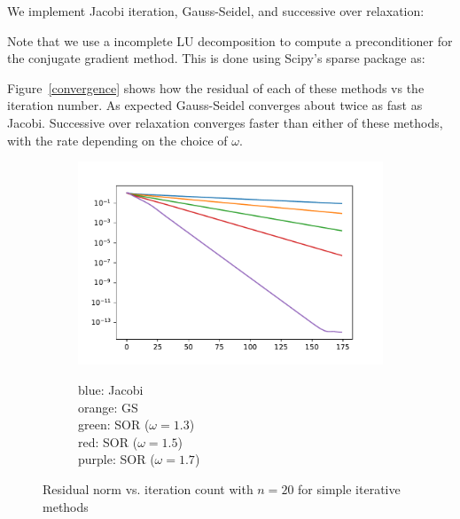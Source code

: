 \documentclass[10pt]{article}
\begin{document}
\begin{solution}[Solution]

We implement Jacobi iteration, Gauss-Seidel, and successive over relaxation:




Note that we use a incomplete LU decomposition to compute a preconditioner for the conjugate gradient method. This is done using Scipy's sparse package as:


Figure~\ref{convergence} shows how the residual of each of these methods vs the iteration number. As expected Gauss-Seidel converges about twice as fast as Jacobi. Successive over relaxation converges faster than either of these methods, with the rate depending on the choice of \( \omega \).
\begin{figure}[H]\centering
    \begin{subfigure}{.6\textwidth}
        \includegraphics[width=\textwidth]{img/1/iter_convergence_20.pdf}
    \end{subfigure}
    \begin{subfigure}{.25\textwidth} \small
        blue: Jacobi\\
        orange: GS \\
        green: SOR (\( \omega = 1.3 \)) \\
        red: SOR (\( \omega = 1.5 \)) \\
        purple: SOR (\( \omega = 1.7 \))
    \end{subfigure}
\caption{Residual norm vs. iteration count with \( n=20 \) for simple iterative methods}

\end{figure}
\end{solution}
\end{document}

